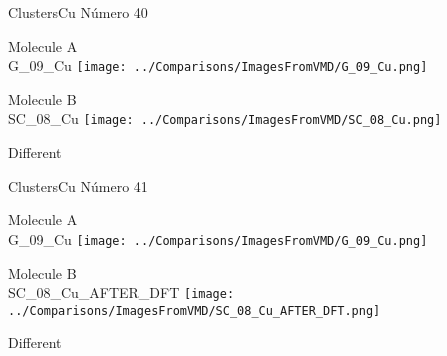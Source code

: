  \newpage

\vtab[-3cm]
\begin{center}
{\large ClustersCu \tab Número 40}
\end{center}
\begin{multicols}{2}
\begin{center}
Molecule A \\ 
G\_09\_Cu
\texttt{[image: ../Comparisons/ImagesFromVMD/G\_09\_Cu.png]}
\\
\vtab

\columnbreak
Molecule B \\ 
SC\_08\_Cu
\texttt{[image: ../Comparisons/ImagesFromVMD/SC\_08\_Cu.png]}
\\
\vtab


\end{center}
\end{multicols}
\begin{center}
\textcolor{NavyBlue}{\Large Different}
\end{center}

 \newpage

\vtab[-3cm]
\begin{center}
{\large ClustersCu \tab Número 41}
\end{center}
\begin{multicols}{2}
\begin{center}
Molecule A \\ 
G\_09\_Cu
\texttt{[image: ../Comparisons/ImagesFromVMD/G\_09\_Cu.png]}
\\
\vtab

\columnbreak
Molecule B \\ 
SC\_08\_Cu\_AFTER\_DFT
\texttt{[image: ../Comparisons/ImagesFromVMD/SC\_08\_Cu\_AFTER\_DFT.png]}
\\
\vtab


\end{center}
\end{multicols}
\begin{center}
\textcolor{NavyBlue}{\Large Different}
\end{center}

 \newpage

